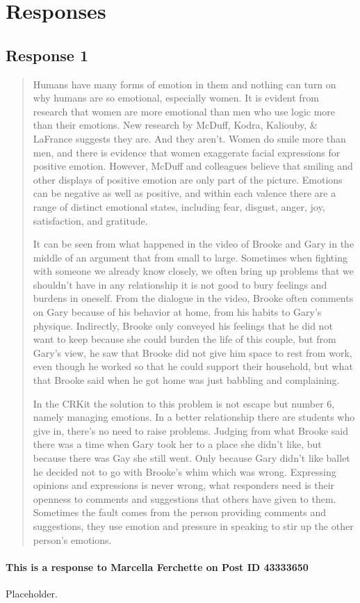 
\section{Responses}
  \subsection{Response 1}
    \begin{quotation}
      Humans have many forms of emotion in them and nothing can turn on why
        humans are so emotional, especially women. It is evident from research
        that women are more emotional than men who use logic more than their
        emotions. New research by McDuff, Kodra, Kaliouby, \& LaFrance suggests
        they are. And they aren’t. Women do smile more than men, and there is
        evidence that women exaggerate facial expressions for positive emotion.
        However, McDuff and colleagues believe that smiling and other displays
        of positive emotion are only part of the picture. Emotions can be
        negative as well as positive, and within each valence there are a range
        of distinct emotional states, including fear, disgust, anger, joy,
        satisfaction, and gratitude.

      It can be seen from what happened in the video of Brooke and Gary in the
        middle of an argument that from small to large. Sometimes when fighting
        with someone we already know closely, we often bring up problems that we
        shouldn't have in any relationship it is not good to bury feelings and
        burdens in oneself. From the dialogue in the video, Brooke often
        comments on Gary because of his behavior at home, from his habits to
        Gary's physique. Indirectly, Brooke only conveyed his feelings that he
        did not want to keep because she could burden the life of this couple,
        but from Gary's view, he saw that Brooke did not give him space to rest
        from work, even though he worked so that he could support their
        household, but what that Brooke said when he got home was just babbling
        and complaining.

      In the CRKit the solution to this problem is not escape but number 6,
        namely managing emotions. In a better relationship there are students
        who give in, there's no need to raise problems. Judging from what
        Brooke said there was a time when Gary took her to a place she didn't
        like, but because there was Gay she still went. Only because Gary didn't
        like ballet he decided not to go with Brooke's whim which was wrong.
        Expressing opinions and expressions is never wrong, what responders
        need is their openness to comments and suggestions that others have
        given to them. Sometimes the fault comes from the person providing
        comments and suggestions, they use emotion and pressure in speaking to
        stir up the other person's emotions.
    \end{quotation}

    \paragraph{This is a response to Marcella Ferchette on Post ID 43333650}
      Placeholder.

